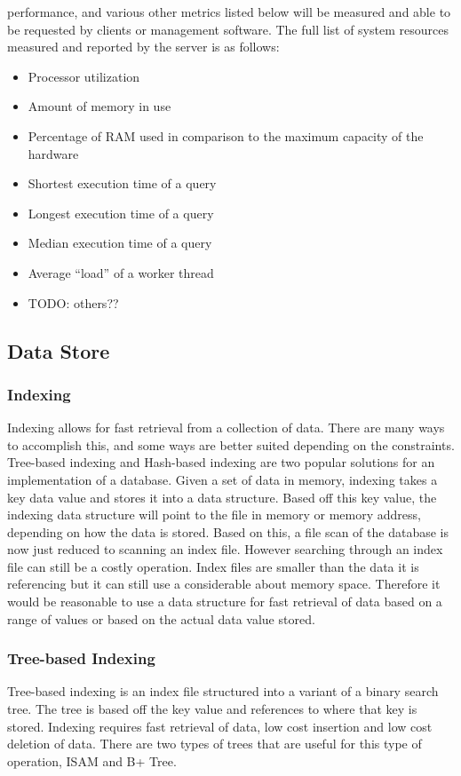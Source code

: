 \documentclass[letterpaper, 12pt]{article}
\begin{document}
performance, and various other metrics listed below will be measured and able to be
requested by clients or management software. The full list of system resources measured
and reported by the server is as follows:
\begin{itemize}
 \item Processor utilization
 \item Amount of memory in use
 \item Percentage of RAM used in comparison to the maximum capacity of the hardware
 \item Shortest execution time of a query
 \item Longest execution time of a query
 \item Median execution time of a query
 \item Average ``load'' of a worker thread
 \item TODO: others??
\end{itemize}

\subsection{Data Store}
\subsubsection{Indexing}
Indexing allows for fast retrieval from a collection of data. There are many ways to accomplish this, and some ways are better suited depending on the constraints. Tree-based indexing and Hash-based indexing are two popular solutions for an implementation of a database. Given a set of data in memory, indexing takes a key data value and stores it into a data structure. Based off this key value, the indexing data structure will point to the file in memory or memory address, depending on how the data is stored. Based on this, a file scan of the database is now just reduced to scanning an index file. 
However searching through an index file can still be a costly operation. Index files are smaller than the data it is referencing but it can still use a considerable about memory space. Therefore it would be reasonable to use a data structure for fast retrieval of data based on a range of values or based on the actual data value stored.


\subsubsection{Tree-based Indexing}
Tree-based indexing is an index file structured into a variant of a binary search tree. The tree is based off the key value and references to where that key is stored. Indexing requires fast retrieval of data, low cost insertion and low cost deletion of data. There are two types of trees that are useful for this type of operation, ISAM and B+ Tree.
\end{document}

